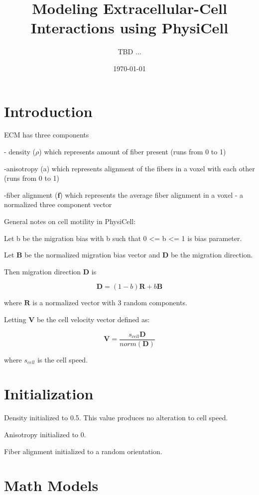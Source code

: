 \documentclass[11pt]{article}
\newcommand{\beq}{\begin{equation}}
\newcommand{\eeq}{\end{equation}}
\renewcommand{\vec}[1]{\mathbf{#1}}
\renewcommand{\vec}[1]{\mathbf{#1}}
\renewcommand{\vec}[1]{\mathbf{#1}}
\renewcommand{\vec}[1]{\mathbf{#1}}
\begin{document}
\author{TBD ... }
\title{Modeling Extracellular-Cell Interactions using PhysiCell
}
\date{\today}

\maketitle

\section{Introduction}\label{sec:Intro}

ECM has three components 

- density ($\rho$) which represents amount of fiber present (runs from 0 to 1)

-anisotropy (a) which represents alignment of the fibers in a voxel with each other (runs from 0 to 1)

-fiber alignment ($\vec f$) which represents the average fiber alignment in a voxel - a normalized three component vector

General notes on cell motility in PhysiCell:

Let b be the migration bias with b such that 0 <= b <= 1 is bias parameter. 

Let $\vec B$ be the normalized migration bias vector and $\vec D$ be the migration direction. 

Then migration direction $\vec D$ is

\beq
\vec D = (1-b) \vec R + b \vec B
\eeq

where $\vec R$ is a normalized vector with 3 random components.

Letting $\vec V$ be the cell velocity vector defined as:

\beq
\vec V = \frac{s_{cell}\vec D}{norm(\vec D)}
\eeq

where $s_{cell}$ is the cell speed.

\section{Initialization}\label{sec:init}

Density initialized to 0.5. This value produces no alteration to cell speed. 

Anisotropy initialized to 0.

Fiber alignment initialized to a random orientation.

\section{Math Models}\label{sec:math_models}
\end{document}
